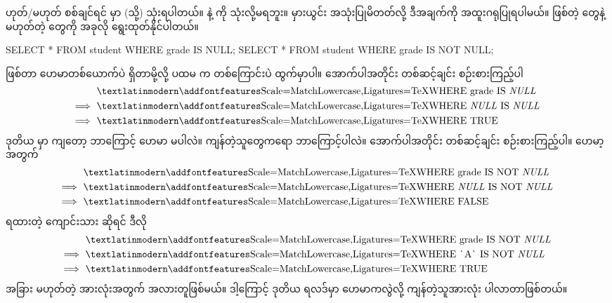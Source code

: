  ဟုတ်/မဟုတ် စစ်ချင်ရင်  မှာ  (သို့)   သုံးရပါတယ်။ \fCode{=} နဲ့ \fCode{<>} ကို သုံးလို့မရဘူး။ မှားယွင်း အသုံးပြုမိတတ်လို့ ဒီအချက်ကို အထူးဂရုပြုရပါမယ်။   ဖြစ်တဲ့  တွေနဲ့  မဟုတ်တဲ့  တွေကို အခုလို ရွေးထုတ်နိုင်ပါတယ်။
%
\begin{sql}
SELECT * FROM student WHERE grade IS NULL;
SELECT * FROM student WHERE grade IS NOT NULL;
\end{sql}
%
  ဖြစ်တာ ဟေမာတစ်ယောက်ပဲ ရှိတာမို့လို့ ပထမ  က  တစ်ကြောင်းပဲ ထွက်မှာပါ။ အောက်ပါအတိုင်း တစ်ဆင့်ချင်း စဉ်းစားကြည့်ပါ
\[
\begin{aligned}
    &\text{\fEn{WHERE grade IS \textit{NULL}}}\\
\implies &\text{\fEn{WHERE \textit{NULL} IS \textit{NULL}}}\\
\implies &\text{\fEn{WHERE TRUE}}\\
\end{aligned}
\]
ဒုတိယ  မှာ ကျတော့ ဘာကြောင့် ဟေမာ မပါလဲ။ ကျန်တဲ့သူတွေကရော ဘာကြောင့်ပါလဲ။ အောက်ပါအတိုင်း တစ်ဆင့်ချင်း စဉ်းစားကြည့်ပါ။ ဟေမာ့  အတွက်%
%
\[
\begin{aligned}
    &\text{\fEn{WHERE grade IS NOT \textit{NULL}}}\\
\implies &\text{\fEn{WHERE \textit{NULL} IS NOT \textit{NULL}}}\\
\implies &\text{\fEn{WHERE FALSE}}\\
\end{aligned}
\]
 ရထားတဲ့ ကျောင်းသား  ဆိုရင် ဒီလို
\[ 
\begin{aligned}
    &\text{\fEn{WHERE grade IS NOT \textit{NULL}}}\\
\implies &\text{\fEn{WHERE \`{}A\`{} IS NOT \textit{NULL}}}\\
\implies &\text{\fEn{WHERE TRUE}}\\
\end{aligned}
\]
အခြား  မဟုတ်တဲ့  အားလုံးအတွက် အလားတူဖြစ်မယ်။ ဒါ့ကြောင့် ဒုတိယ  ရလဒ်မှာ ဟေမာကလွဲလို့ ကျန်တဲ့သူအားလုံး ပါလာတာဖြစ်တယ်။

